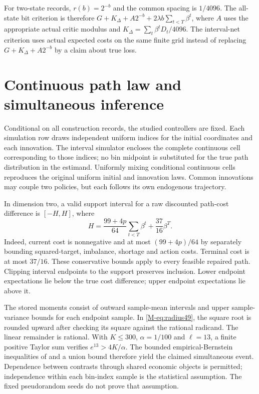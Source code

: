 \documentclass[ecta,nameyear,draft]{econsocart}
\begin{document}
For two-state records, $r(b)=2^{-b}$ and the common spacing is $1/4096$. The all-state bit criterion is therefore $G+K_\Delta+A2^{-b}+2\lambda b\sum_{t<T}\beta^t$, where $A$ uses the appropriate actual critic modulus and $K_\Delta=\sum_t\beta^tD_t/4096$. The interval-net criterion uses actual expected costs on the same finite grid instead of replacing $G+K_\Delta+A2^{-b}$ by a claim about true loss.

\section{Continuous path law and simultaneous inference}\label{supp:inference49}
Conditional on all construction records, the studied controllers are fixed. Each simulation row draws independent uniform indices for the initial coordinates and each innovation. The interval simulator encloses the complete continuous cell corresponding to those indices; no bin midpoint is substituted for the true path distribution in the estimand. Uniformly mixing conditional continuous cells reproduces the original uniform initial and innovation laws. Common innovations may couple two policies, but each follows its own endogenous trajectory.

In dimension two, a valid support interval for a raw discounted path-cost difference is $[-H,H]$, where
\[
 H=\frac{99+4p}{64}\sum_{t<T}\beta^t+\frac{37}{16}\beta^T.
\]
Indeed, current cost is nonnegative and at most $(99+4p)/64$ by separately bounding squared-target, imbalance, shortage and action costs. Terminal cost is at most $37/16$. These conservative bounds apply to every feasible repaired path. Clipping interval endpoints to the support preserves inclusion. Lower endpoint expectations lie below the true cost difference; upper endpoint expectations lie above it.

The stored moments consist of outward sample-mean intervals and upper sample-variance bounds for each endpoint sample. In \eqref{M-eq:radius49}, the square root is rounded upward after checking its square against the rational radicand. The linear remainder is rational. With $K\le300$, $\alpha=1/100$ and $\ell=13$, a finite positive Taylor sum verifies $e^{13}>4K/\alpha$. The bounded empirical-Bernstein inequalities of \citet{maurer2009} and a union bound therefore yield the claimed simultaneous event. Dependence between contrasts through shared economic objects is permitted; independence within each bin-index sample is the statistical assumption. The fixed pseudorandom seeds do not prove that assumption.
\end{document}
